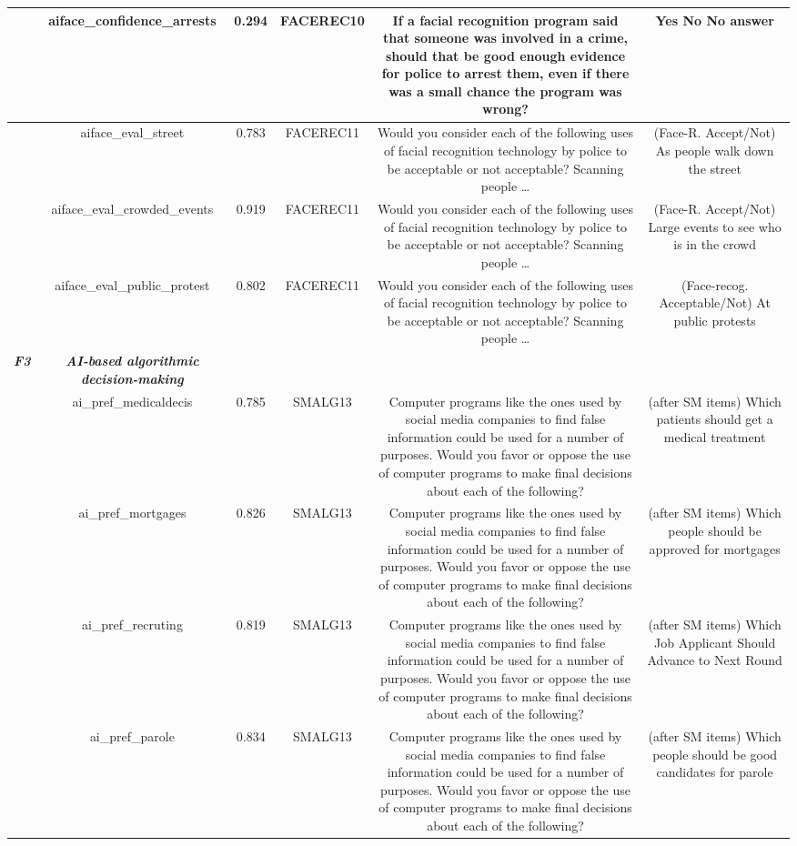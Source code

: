 {\begin{tabular}{c | c | c | c | c | c}
  \hline
   & aiface\_confidence\_arrests & 0.294 & FACEREC10 & If a facial recognition program said that someone was involved in a crime, should that be good enough evidence for police to arrest them, even if there was a small chance the program was wrong? & Yes
 No
 No answer \\
  \hline
   & aiface\_eval\_street & 0.783 & FACEREC11 & Would you consider each of the following uses of facial recognition technology by police to be acceptable or not acceptable? Scanning people … & (Face-R. Accept/Not) As people walk down the street \\
  \hline
   & aiface\_eval\_crowded\_events & 0.919 & FACEREC11 & Would you consider each of the following uses of facial recognition technology by police to be acceptable or not acceptable? Scanning people … & (Face-R. Accept/Not) Large events to see who is in the crowd \\
  \hline
  \textit{ } & aiface\_eval\_public\_protest & 0.802 & FACEREC11 & Would you consider each of the following uses of facial recognition technology by police to be acceptable or not acceptable? Scanning people … & (Face-recog. Acceptable/Not) At public protests \\
  \hline
  \textit{\textbf{F3}} & \textit{\textbf{AI-based algorithmic decision-making}} \\
  \hline
   & ai\_pref\_medicaldecis & 0.785 & SMALG13 & Computer programs like the ones used by social media companies to find false information could be used for a number of purposes. Would you favor or oppose the use of computer programs to make final decisions about each of the following? & (after SM items) Which patients should get a medical treatment \\
  \hline
   & ai\_pref\_mortgages & 0.826 & SMALG13 & Computer programs like the ones used by social media companies to find false information could be used for a number of purposes. Would you favor or oppose the use of computer programs to make final decisions about each of the following? & (after SM items) Which people should be approved for mortgages \\
  \hline
   & ai\_pref\_recruting & 0.819 & SMALG13 & Computer programs like the ones used by social media companies to find false information could be used for a number of purposes. Would you favor or oppose the use of computer programs to make final decisions about each of the following? & (after SM items) Which Job Applicant Should Advance to Next Round \\
  \hline
  \textit{ } & ai\_pref\_parole & 0.834 & SMALG13 & Computer programs like the ones used by social media companies to find false information could be used for a number of purposes. Would you favor or oppose the use of computer programs to make final decisions about each of the following? & (after SM items) Which people should be good candidates for parole \\

\end{tabular}}
